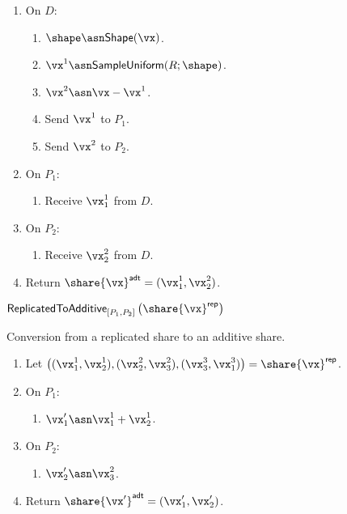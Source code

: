   \begin{enumerate}
    \item On $D$:
  \begin{enumerate}
    \item $\shape \asn \mathsf{Shape}(\vx)$.
    \item $\vx^1 \asn \mathsf{SampleUniform}(R; \shape)$.
    \item $\vx^2 \asn \vx - \vx^1$.
    \item Send $\vx^1$ to $P_1$.
    \item Send $\vx^2$ to $P_2$.
  \end{enumerate}
  \item On $P_1$:
  \begin{enumerate}
      \item Receive $\vx^1_1$ from $D$.
  \end{enumerate}
  \item On $P_2$:
  \begin{enumerate}
      \item Receive $\vx^2_2$ from $D$.
  \end{enumerate}
  \item Return $\share{\vx}^{\mathsf{adt}} = (\vx^1_1, \vx^2_2)$.
\end{enumerate}


\msubsubsection
{$\mathsf{ReplicatedToAdditive}_{[P_1, P_2]}\left( \share{\vx}^{\mathsf{rep}} \right)$}
\label{fig:replicated-to-additive}

  Conversion from a replicated share to an additive share.
  \begin{enumerate}

  \item Let $\left( (\vx_1^1, \vx_2^1), (\vx_2^2, \vx_3^2), (\vx_3^3, \vx_1^3) \right) = \share{\vx}^{\mathsf{rep}}$.

  \item On $P_1$:
    \begin{enumerate}
    \item $\vx'_1 \asn \vx^1_1 + \vx^1_2$.
    \end{enumerate}

  \item On $P_2$:
    \begin{enumerate}
    \item $\vx'_2 \asn \vx^2_3$.
    \end{enumerate}

  \item Return $\share{\vx'}^{\mathsf{adt}} = (\vx'_1, \vx'_2)$.
\end{enumerate}








